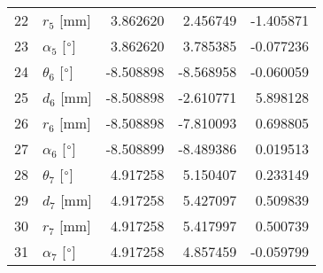 \documentclass{standalone}%
\begin{document}
\begin{tabular}{llrrr}
22 &              $r_{5}$ [mm] &  3.862620 &   2.456749 &  -1.405871 \\
23 &  $\alpha_{5}$ [$\degree$] &  3.862620 &   3.785385 &  -0.077236 \\
24 &  $\theta_{6}$ [$\degree$] & -8.508898 &  -8.568958 &  -0.060059 \\
25 &              $d_{6}$ [mm] & -8.508898 &  -2.610771 &   5.898128 \\
26 &              $r_{6}$ [mm] & -8.508898 &  -7.810093 &   0.698805 \\
27 &  $\alpha_{6}$ [$\degree$] & -8.508899 &  -8.489386 &   0.019513 \\
28 &  $\theta_{7}$ [$\degree$] &  4.917258 &   5.150407 &   0.233149 \\
29 &              $d_{7}$ [mm] &  4.917258 &   5.427097 &   0.509839 \\
30 &              $r_{7}$ [mm] &  4.917258 &   5.417997 &   0.500739 \\
31 &  $\alpha_{7}$ [$\degree$] &  4.917258 &   4.857459 &  -0.059799 \\
\bottomrule
\end{tabular}
%
\end{document}
